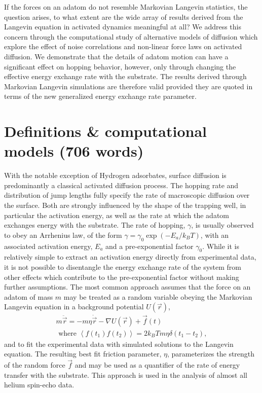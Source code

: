 \documentclass[7pt]{article}
\begin{document}
If the forces on an adatom do not resemble Markovian Langevin statistics, the question arises, to what extent are the wide array of results derived from the Langevin equation in activated dynamics meaningful at all? We address this concern through the computational study of alternative models of diffusion which explore the effect of noise correlations and non-linear force laws on activated diffusion. We demonstrate that the details of adatom motion can have a significant effect on hopping behavior, however, only through changing the effective energy exchange rate with the substrate. The results derived through Markovian Langevin simulations are therefore valid provided they are quoted in terms of the new generalized energy exchange rate parameter. 

\section*{Definitions \& computational models (706 words)}

With the notable exception of Hydrogen adsorbates\cite{McIntosh2013}, surface diffusion is predominantly a classical activated diffusion process. The hopping rate and distribution of jump lengths fully specify the rate of macroscopic diffusion over the surface. Both are strongly influenced by the shape of the trapping well, in particular the activation energy, as well as the rate at which the adatom exchanges energy with the substrate. The rate of hopping, $\gamma$, is usually observed to obey an Arrhenius law, of the form $\gamma = \gamma_0 \exp\left(-E_a/k_BT\right)$, with an associated activation energy, $E_a$ and a pre-exponential factor $\gamma_0$. While it is relatively simple to extract an activation energy directly from experimental data\cite{Diamant,Alexandrowicz2006}, it is not possible to disentangle the energy exchange rate of the system from other effects which contribute to the pre-exponential factor without making further assumptions. The most common approach assumes that the force on an adatom of mass $m$ may be treated as a random variable obeying the Markovian Langevin equation in a background potential $U(\vec{r})$,
\begin{equation}
\begin{gathered}
	m\ddot{\vec{r}}=-m\eta\dot{\vec{r}}-\nabla U(\vec{r})+\vec{f}(t) \\ 
	\text{ where } \left<f(t_1)f(t_2)\right>=2k_BTm\eta\delta(t_1-t_2),
	\label{eq:langevin}
\end{gathered}
\end{equation}
and to fit the experimental data with simulated solutions to the Langevin equation. The resulting best fit friction parameter, $\eta$, parameterizes the strength of the random force $\vec{f}$ and may be used as a quantifier of the rate of energy transfer with the substrate. This approach is used in the analysis of almost all helium spin-echo data\cite{Jardine200911, Jardine200906}. 
\end{document}
